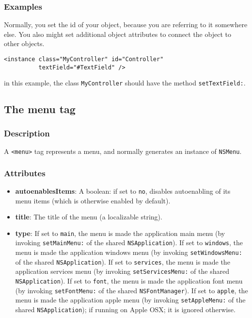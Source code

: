 \subsubsection{Examples}
Normally, you set the id of your object, because you are referring to
it somewhere else.  You also might set additional object attributes to
connect the object to other objects.
\begin{verbatim}
<instance class="MyController" id="Controller" 
          textField="#TextField" />
\end{verbatim}
in this example, the class \texttt{MyController} should have the method
\texttt{setTextField:}.

\subsection{The menu tag}

\subsubsection{Description}
A \texttt{<menu>} tag represents a menu, and normally generates an
instance of \texttt{NSMenu}.

\subsubsection{Attributes}
\begin{itemize}
\item {\bf autoenablesItems}: A boolean: if set to \texttt{no}, disables 
autoenabling of its menu items (which is otherwise enabled by default).
\item {\bf title}: The title of the menu (a localizable string).
\item {\bf type}: If set to \texttt{main}, the menu is made the
application main menu (by invoking \texttt{setMainMenu:} of the shared
\texttt{NSApplication}).  If set to \texttt{windows}, the menu is made
the application windows menu (by invoking \texttt{setWindowsMenu:} of
the shared \texttt{NSApplication}).  If set to \texttt{services}, the
menu is made the application services menu (by invoking
\texttt{setServicesMenu:} of the shared \texttt{NSApplication}).  If
set to \texttt{font}, the menu is made the application font menu (by
invoking \texttt{setFontMenu:} of the shared \texttt{NSFontManager}).
If set to \texttt{apple}, the menu is made the application apple menu
(by invoking \texttt{setAppleMenu:} of the shared
\texttt{NSApplication}); if running on Apple OSX; it is ignored
otherwise.
\end{itemize}

